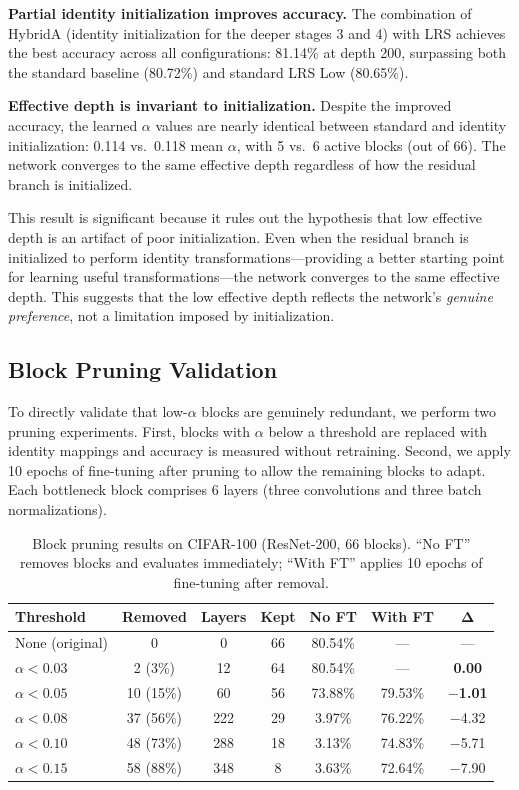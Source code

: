 \documentclass[preprint,12pt]{elsarticle}
\begin{document}
\textbf{Partial identity initialization improves accuracy.} The combination of HybridA (identity initialization for the deeper stages 3 and 4) with LRS achieves the best accuracy across all configurations: 81.14\% at depth 200, surpassing both the standard baseline (80.72\%) and standard LRS Low (80.65\%).

\textbf{Effective depth is invariant to initialization.} Despite the improved accuracy, the learned $\alpha$ values are nearly identical between standard and identity initialization: 0.114 vs.\ 0.118 mean $\alpha$, with 5 vs.\ 6 active blocks (out of 66). The network converges to the same effective depth regardless of how the residual branch is initialized.

This result is significant because it rules out the hypothesis that low effective depth is an artifact of poor initialization. Even when the residual branch is initialized to perform identity transformations---providing a better starting point for learning useful transformations---the network converges to the same effective depth. This suggests that the low effective depth reflects the network's \emph{genuine preference}, not a limitation imposed by initialization.

\subsection{Block Pruning Validation}
\label{sec:pruning}

To directly validate that low-$\alpha$ blocks are genuinely redundant, we perform two pruning experiments. First, blocks with $\alpha$ below a threshold are replaced with identity mappings and accuracy is measured without retraining. Second, we apply 10 epochs of fine-tuning after pruning to allow the remaining blocks to adapt. Each bottleneck block comprises 6 layers (three convolutions and three batch normalizations).

\begin{table}[t]
\centering
\caption{Block pruning results on CIFAR-100 (ResNet-200, 66 blocks). ``No FT'' removes blocks and evaluates immediately; ``With FT'' applies 10 epochs of fine-tuning after removal.}
\label{tab:pruning}
\begin{tabular}{lcccccc}
\toprule
\textbf{Threshold} & \textbf{Removed} & \textbf{Layers} & \textbf{Kept} & \textbf{No FT} & \textbf{With FT} & $\mathbf{\Delta}$ \\
\midrule
None (original) & 0 & 0 & 66 & 80.54\% & --- & --- \\
$\alpha < 0.03$ & 2 (3\%) & 12 & 64 & 80.54\% & --- & \textbf{0.00} \\
$\alpha < 0.05$ & 10 (15\%) & 60 & 56 & 73.88\% & 79.53\% & \textbf{$-$1.01} \\
$\alpha < 0.08$ & 37 (56\%) & 222 & 29 & 3.97\% & 76.22\% & $-$4.32 \\
$\alpha < 0.10$ & 48 (73\%) & 288 & 18 & 3.13\% & 74.83\% & $-$5.71 \\
$\alpha < 0.15$ & 58 (88\%) & 348 & 8 & 3.63\% & 72.64\% & $-$7.90 \\
\bottomrule
\end{tabular}
\end{table}
\end{document}
